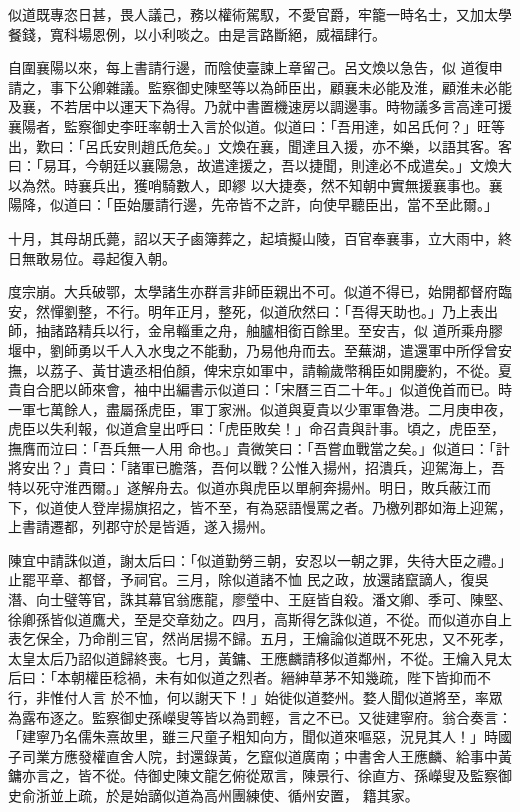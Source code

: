 \begin{pinyinscope}
 似道既專恣日甚，畏人議己，務以權術駕馭，不愛官爵，牢籠一時名士，又加太學餐錢，寬科場恩例，以小利啖之。由是言路斷絕，威福肆行。



 自圍襄陽以來，每上書請行邊，而陰使臺諫上章留己。呂文煥以急告，似
 道復申請之，事下公卿雜議。監察御史陳堅等以為師臣出，顧襄未必能及淮，顧淮未必能及襄，不若居中以運天下為得。乃就中書置機速房以調邊事。時物議多言高達可援襄陽者，監察御史李旺率朝士入言於似道。似道曰：「吾用達，如呂氏何？」旺等出，歎曰：「呂氏安則趙氏危矣。」文煥在襄，聞達且入援，亦不樂，以語其客。客曰：「易耳，今朝廷以襄陽急，故遣達援之，吾以捷聞，則達必不成遣矣。」文煥大以為然。時襄兵出，獲哨騎數人，即繆
 以大捷奏，然不知朝中實無援襄事也。襄陽降，似道曰：「臣始屢請行邊，先帝皆不之許，向使早聽臣出，當不至此爾。」



 十月，其母胡氏薨，詔以天子鹵簿葬之，起墳擬山陵，百官奉襄事，立大雨中，終日無敢易位。尋起復入朝。



 度宗崩。大兵破鄂，太學諸生亦群言非師臣親出不可。似道不得已，始開都督府臨安，然憚劉整，不行。明年正月，整死，似道欣然曰：「吾得天助也。」乃上表出師，抽諸路精兵以行，金帛輜重之舟，舳臚相銜百餘里。至安吉，似
 道所乘舟膠堰中，劉師勇以千人入水曳之不能動，乃易他舟而去。至蕪湖，遣還軍中所俘曾安撫，以荔子、黃甘遺丞相伯顏，俾宋京如軍中，請輸歲幣稱臣如開慶約，不從。夏貴自合肥以師來會，袖中出編書示似道曰：「宋曆三百二十年。」似道俛首而已。時一軍七萬餘人，盡屬孫虎臣，軍丁家洲。似道與夏貴以少軍軍魯港。二月庚申夜，虎臣以失利報，似道倉皇出呼曰：「虎臣敗矣！」命召貴與計事。頃之，虎臣至，撫膺而泣曰：「吾兵無一人用
 命也。」貴微笑曰：「吾嘗血戰當之矣。」似道曰：「計將安出？」貴曰：「諸軍已膽落，吾何以戰？公惟入揚州，招潰兵，迎駕海上，吾特以死守淮西爾。」遂解舟去。似道亦與虎臣以單舸奔揚州。明日，敗兵蔽江而下，似道使人登岸揚旗招之，皆不至，有為惡語慢罵之者。乃檄列郡如海上迎駕，上書請遷都，列郡守於是皆遁，遂入揚州。



 陳宜中請誅似道，謝太后曰：「似道勤勞三朝，安忍以一朝之罪，失待大臣之禮。」止罷平章、都督，予祠官。三月，除似道諸不恤
 民之政，放還諸竄謫人，復吳潛、向士璧等官，誅其幕官翁應龍，廖瑩中、王庭皆自殺。潘文卿、季可、陳堅、徐卿孫皆似道鷹犬，至是交章劾之。四月，高斯得乞誅似道，不從。而似道亦自上表乞保全，乃命削三官，然尚居揚不歸。五月，王爚論似道既不死忠，又不死孝，太皇太后乃詔似道歸終喪。七月，黃鏞、王應麟請移似道鄰州，不從。王爚入見太后曰：「本朝權臣稔禍，未有如似道之烈者。縉紳草茅不知幾疏，陛下皆抑而不行，非惟付人言
 於不恤，何以謝天下！」始徙似道婺州。婺人聞似道將至，率眾為露布逐之。監察御史孫嶸叟等皆以為罰輕，言之不已。又徙建寧府。翁合奏言：「建寧乃名儒朱熹故里，雖三尺童子粗知向方，聞似道來嘔惡，況見其人！」時國子司業方應發權直舍人院，封還錄黃，乞竄似道廣南；中書舍人王應麟、給事中黃鏞亦言之，皆不從。侍御史陳文龍乞俯從眾言，陳景行、徐直方、孫嶸叟及監察御史俞浙並上疏，於是始謫似道為高州團練使、循州安置，
 籍其家。




\end{pinyinscope}

